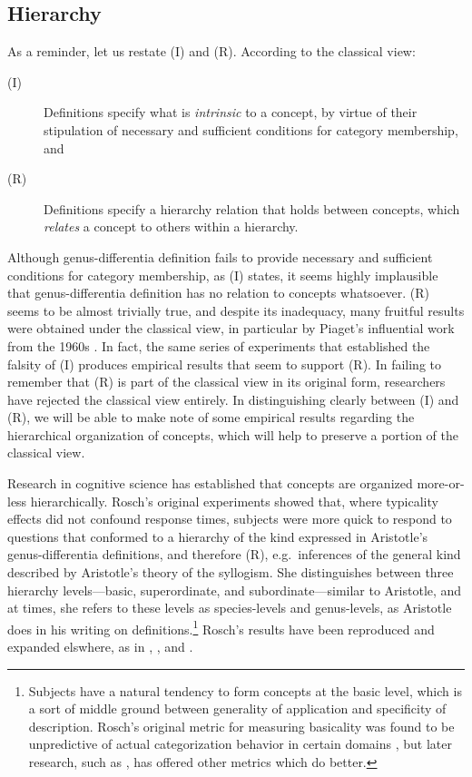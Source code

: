 \subsection{Hierarchy}

As a reminder, let us restate (I) and (R). According to the classical view:
\begin{description}
\item[(I)] Definitions specify what is \emph{intrinsic} to a concept, by virtue of their stipulation of necessary and sufficient conditions for category membership, and
\item[(R)] Definitions specify a hierarchy relation that holds between concepts, which \emph{relates} a concept to others within a hierarchy.
\end{description}

Although genus-differentia definition fails to provide necessary and sufficient conditions for category membership, as (I) states, it seems highly implausible that genus-differentia definition has no relation to concepts whatsoever. (R) seems to be almost trivially true, and despite its inadequacy, many fruitful results were obtained under the classical view, in particular by Piaget's influential work from the 1960s \cite[pg. 15]{murphy_big_2002}. In fact, the same series of experiments that established the falsity of (I) produces empirical results that seem to support (R). In failing to remember that (R) is part of the classical view in its original form, researchers have rejected the classical view entirely. In distinguishing clearly between (I) and (R), we will be able to make note of some empirical results regarding the hierarchical organization of concepts, which will help to preserve a portion of the classical view.

Research in cognitive science has established that concepts are organized more-or-less hierarchically. Rosch's original experiments showed that, where typicality effects did not confound response times, subjects were more quick to respond to questions that conformed to a hierarchy of the kind expressed in Aristotle's genus-differentia definitions, and therefore (R), e.g.\ inferences of the general kind described by Aristotle's theory of the syllogism. She distinguishes between three hierarchy levels---basic, superordinate, and subordinate---similar to Aristotle, and at times, she refers to these levels as species-levels and genus-levels, as Aristotle does in his writing on definitions.\footnote{ Subjects have a natural tendency to form concepts at the basic level, which is a sort of middle ground between generality of application and specificity of description. Rosch's original metric for measuring basicality was found to be unpredictive of actual categorization behavior in certain domains \cite{murphy_cue_1982}, but later research, such as \cite{murphy_category_1985}, has offered other metrics which do better.} Rosch's results have been reproduced and expanded elswhere, as in \cite{inhelder_early_1964}, \cite{collins_retrieval_1975}, and \cite{berlin_ethnobiological_1992}.

